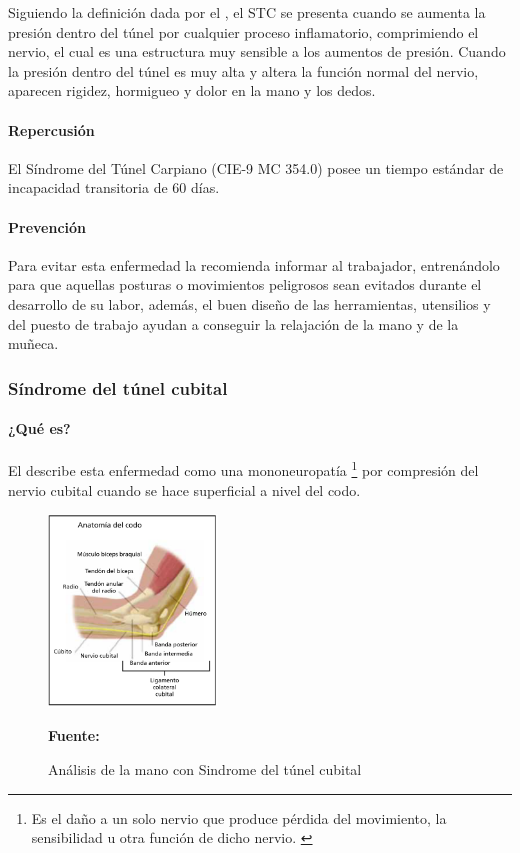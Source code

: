 Siguiendo la definición dada por el \parencite{INSHT2017SindromeCarpiano}, el STC se presenta cuando se aumenta la presión dentro del túnel por cualquier proceso inflamatorio, comprimiendo el nervio, el cual es una estructura muy sensible a los aumentos de presión. Cuando la presión dentro del túnel es muy alta y altera la función normal del nervio, aparecen rigidez, hormigueo y dolor en la mano y los dedos.
\paragraph{Repercusión}
El Síndrome del Túnel Carpiano (CIE-9 MC 354.0) posee un tiempo estándar de incapacidad transitoria de 60 días\parencite[6]{INSHT2017SindromeCarpiano}.
\paragraph{Prevención}
Para evitar esta enfermedad la \parencite{FundacionSantaFedeBogota2016SindromeTratarlo} recomienda informar al trabajador, entrenándolo para que aquellas posturas o movimientos peligrosos sean evitados durante el desarrollo de su labor, además, el buen diseño de las herramientas, utensilios y del puesto de trabajo ayudan a conseguir la relajación de la mano y de la muñeca.

\subsubsection{Síndrome del túnel cubital}
\paragraph{¿Qué es?}
El \parencite[1]{INSHT2017SindromeCodo} describe esta enfermedad como una mononeuropatía \footnote{Es el daño a un solo nervio que produce pérdida del movimiento, la sensibilidad u otra función de dicho nervio. \parencite{MedlinePlus2018Mononeuropatia}} por compresión del nervio cubital cuando se hace superficial a nivel del codo.
\begin{figure}[H]
    \centering
    \includegraphics[width=0.4\textwidth]{Anexos/LATEX/chapters/images/AnaCodo.png}
    \caption{Análisis de la mano con Sindrome del túnel cubital}
    \small{\textbf{Fuente:} \parencite[1]{INSHT2017SindromeCodo}}
    \label{AnaCodo}
\end{figure}
